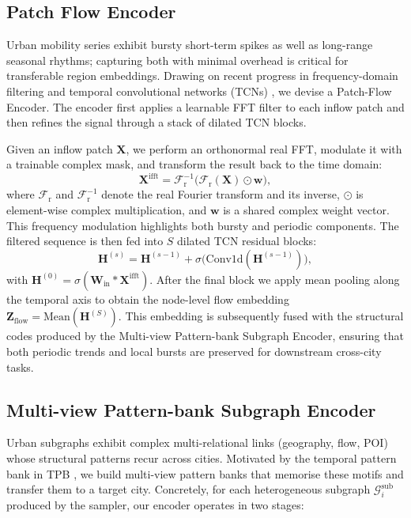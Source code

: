\subsection{Patch Flow Encoder}

Urban mobility series exhibit bursty short-term spikes as well as long-range seasonal rhythms; capturing both with minimal overhead is critical for transferable region embeddings. Drawing on recent progress in frequency-domain filtering and temporal convolutional networks (TCNs) \cite{TCN}, we devise a Patch-Flow Encoder. The encoder first applies a learnable FFT filter to each inflow patch and then refines the signal through a stack of dilated TCN blocks.

Given an inflow patch $\mathbf X$, we perform an orthonormal real FFT, modulate it with a trainable complex mask, and transform the result back to the time domain:
\begin{equation}
\mathbf X^{\mathrm{ifft}}
=\mathcal F_{\mathrm r}^{-1}\bigl(\mathcal F_{\mathrm r}(\mathbf X)\odot\mathbf w\bigr),
\end{equation}
where $\mathcal F_{\mathrm r}$ and $\mathcal F_{\mathrm r}^{-1}$ denote the real Fourier transform and its inverse, $\odot$ is element-wise complex multiplication, and $\mathbf w$ is a shared complex weight vector. This frequency modulation highlights both bursty and periodic components. The filtered sequence is then fed into $S$ dilated TCN residual blocks:
\begin{equation}
\mathbf H^{(s)}
=\mathbf H^{(s-1)}+\sigma\bigl(\text{Conv1d}(\mathbf H^{(s-1)})\bigr),
\end{equation}
with $\mathbf H^{(0)}=\sigma(\mathbf W_{\text{in}}*\mathbf X^{\mathrm{ifft}})$. After the final block we apply mean pooling along the temporal axis to obtain the node-level flow embedding $\mathbf Z_{\text{flow}}=\mathrm{Mean}(\mathbf H^{(S)})$. This embedding is subsequently fused with the structural codes produced by the Multi-view Pattern-bank Subgraph Encoder, ensuring that both periodic trends and local bursts are preserved for downstream cross-city tasks.

\subsection{Multi-view Pattern-bank Subgraph Encoder}

Urban subgraphs exhibit complex multi-relational links (geography, flow, POI) whose structural patterns recur across cities. Motivated by the temporal pattern bank in TPB \cite{TPB}, we build multi-view pattern banks that memorise these motifs and transfer them to a target city. Concretely, for each heterogeneous subgraph $\mathcal G^{\text{sub}}_{i}$ produced by the sampler, our encoder operates in two stages:


